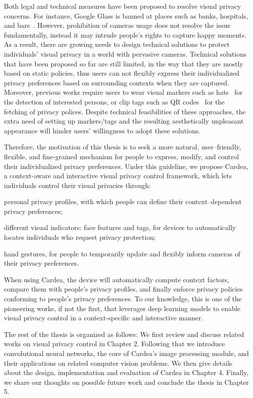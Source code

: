 Both legal and technical measures have been proposed to resolve visual privacy concerns. For instance, Google Glass is banned at places such as banks, hospitals, and bars~\cite{links:glassbanned}. However, prohibition of cameras usage does not resolve the issue fundamentally, instead it may intrude people's rights to capture happy moments. As a result, there are growing needs to design technical solutions to protect individuals' visual privacy in a world with pervasive cameras. Technical solutions that have been proposed so far are still limited, in the way that they are mostly based on static policies, thus users can not flexibly express their individualized privacy preferences based on surrounding contexts when they are captured. Moreover, previous works require users to wear visual markers such as hats~\cite{schiff2009respectful} for the detection of interested persons, or clip tags such as QR codes~\cite{bo2014privacy,roesner2014world} for the fetching of privacy polices. Despite technical feasibilities of these approaches, the extra need of setting up markers/tags and the resulting aesthetically unpleasant appearance will hinder users' willingness to adopt these solutions.

Therefore, the motivation of this thesis is to seek a more natural, user–friendly, flexible, and fine-grained mechanism for people to express, modify, and control their individualized privacy preferences. Under this guideline, we propose Cardea, a context-aware and interactive visual privacy control framework, which lets individuals control their visual privacies through:
\begin{inparaenum}
\item personal privacy profiles, with which people can define their context–dependent privacy preferences;
\item different visual indicators: face features and tags, for devices to automatically locates individuals who request privacy protection;
\item hand gestures, for people to temporarily update and flexibly inform cameras of their privacy preferences.
\end{inparaenum}
When using Cardea, the device will automatically compute context factors, compare them with people’s privacy profiles, and finally enforce privacy policies conforming to people’s privacy preferences. To our knowledge, this is one of the pioneering works, if not the first, that leverages deep learning models to enable visual privacy control in a context-specific and interactive manner.

The rest of the thesis is organized as follows: We first review and discuss related works on visual privacy control in Chapter 2. Following that we introduce convolutional neural networks, the core of Cardea's image processing module, and their applications on related computer vision problems. We then give details about the design, implementation and evaluation of Cardea in Chapter 4. Finally, we share our thoughts on possible future work and conclude the thesis in Chapter 5.

\newpage
